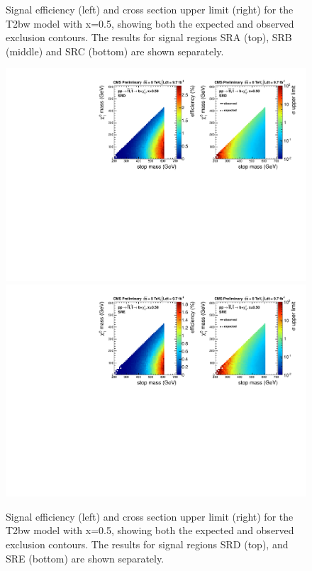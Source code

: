 \begin{figure}[hbt]
\begin{center}
    \caption{Signal efficiency (left) and cross section upper limit
      (right) for the T2bw model with x=0.5, showing both the expected and
      observed exclusion contours. The results for signal regions SRA (top),
      SRB (middle) and SRC (bottom) are shown separately.}
\label{fig:allsrlimitsT2bw0p5}
      \end{center}
\end{figure}

\begin{figure}[hbt]
  \begin{center}
        \includegraphics[width=1.\linewidth]{plots/T2bw_x50_SRD.pdf}
        \includegraphics[width=1.\linewidth]{plots/T2bw_x50_SRE.pdf}
    \caption{Signal efficiency (left) and cross section upper limit
      (right) for the T2bw model with x=0.5, showing both the expected and
      observed exclusion contours. The results for signal regions SRD (top),
      and SRE (bottom) are shown separately.}
\label{fig:allsrlimits2T2bw0p5}
      \end{center}
\end{figure}

